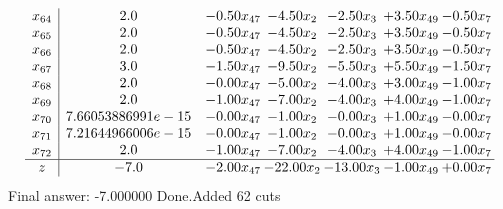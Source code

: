 \documentclass[8pt]{article}
\begin{document}
\[\begin{array}{c| c c@{\hskip 2pt} c@{\hskip 2pt} c@{\hskip 2pt} c@{\hskip 2pt} c@{\hskip 2pt} }
 x_{64}   &  2.0 & -0.50 x_{47} & -4.50 x_{2} & -2.50 x_{3} & +  3.50 x_{49} & -0.50 x_{7}\\
 x_{65}   &  2.0 & -0.50 x_{47} & -4.50 x_{2} & -2.50 x_{3} & +  3.50 x_{49} & -0.50 x_{7}\\
 x_{66}   &  2.0 & -0.50 x_{47} & -4.50 x_{2} & -2.50 x_{3} & +  3.50 x_{49} & -0.50 x_{7}\\
 x_{67}   &  3.0 & -1.50 x_{47} & -9.50 x_{2} & -5.50 x_{3} & +  5.50 x_{49} & -1.50 x_{7}\\
 x_{68}   &  2.0 & -0.00 x_{47} & -5.00 x_{2} & -4.00 x_{3} & +  3.00 x_{49} & -1.00 x_{7}\\
 x_{69}   &  2.0 & -1.00 x_{47} & -7.00 x_{2} & -4.00 x_{3} & +  4.00 x_{49} & -1.00 x_{7}\\
 x_{70}   &  7.66053886991e-15 & -0.00 x_{47} & -1.00 x_{2} & -0.00 x_{3} & +  1.00 x_{49} & -0.00 x_{7}\\
 x_{71}   &  7.21644966006e-15 & -0.00 x_{47} & -1.00 x_{2} & -0.00 x_{3} & +  1.00 x_{49} & -0.00 x_{7}\\
 x_{72}   &  2.0 & -1.00 x_{47} & -7.00 x_{2} & -4.00 x_{3} & +  4.00 x_{49} & -1.00 x_{7}\\
\hline
z    &  -7.0 & -2.00 x_{47} & -22.00 x_{2} & -13.00 x_{3} & -1.00 x_{49} & +  0.00 x_{7}\\
\end{array}\]
 Final answer: -7.000000 
Done.Added 62 cuts 
\end{document}
